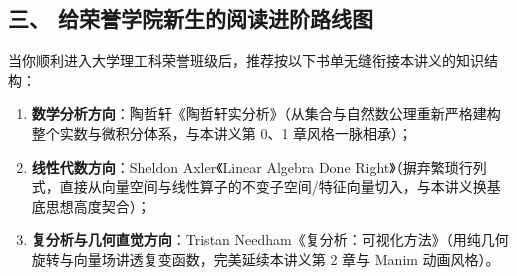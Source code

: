 \subsection*{三、 给荣誉学院新生的阅读进阶路线图}

当你顺利进入大学理工科荣誉班级后，推荐按以下书单无缝衔接本讲义的知识结构：
\begin{enumerate}
    \item \textbf{数学分析方向}：陶哲轩《陶哲轩实分析》（从集合与自然数公理重新严格建构整个实数与微积分体系，与本讲义第 0、1 章风格一脉相承）；
    \item \textbf{线性代数方向}：Sheldon Axler《Linear Algebra Done Right》（摒弃繁琐行列式，直接从向量空间与线性算子的不变子空间/特征向量切入，与本讲义换基底思想高度契合）；
    \item \textbf{复分析与几何直觉方向}：Tristan Needham《复分析：可视化方法》（用纯几何旋转与向量场讲透复变函数，完美延续本讲义第 2 章与 Manim 动画风格）。
\end{enumerate}
